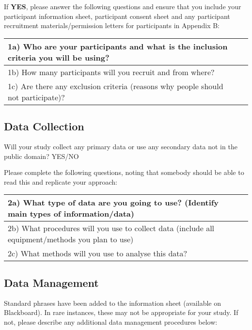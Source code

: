 \documentclass[../CHEFCookingHelperForEveryonesFridge.tex]{subfiles}
\begin{document}
If \textbf{YES}, please answer the following questions and ensure that you include your participant
information sheet, participant consent sheet and any participant recruitment materials/permission
letters for participants in Appendix B:

\begin{table}[h!]
    \begin{tabulary}{\textwidth}{|L|L|}
        \hline
        1a) Who are your participants and what is the inclusion criteria you will be using? & \\\hline
        1b) How many participants will you recruit and from where? & \\\hline
        1c) Are there any exclusion criteria (reasons why people should not participate)? & \\\hline
    \end{tabulary}
\end{table}

\subsection{Data Collection}
Will your study collect any primary data or use any secondary data not in the public domain?                              						YES/NO

Please complete the following questions, noting that somebody should be able to read this and replicate your approach:

\clearpage
\begin{table}[h!]
    \begin{tabulary}{\textwidth}{|L|L|}
        \hline
        2a) What type of data are you going to use? (Identify main types of information/data) & \\\hline
        2b) What procedures will you use to collect data (include all equipment/methods you plan to use) & \\\hline
        2c) What methods will you use to analyse this data? & \\\hline
    \end{tabulary}
\end{table}

\subsection{Data Management}
Standard phrases have been added to the information sheet (available on Blackboard). In rare instances,
these may not be appropriate for your study. If not,
please describe any additional data management procedures below:
\end{document}
